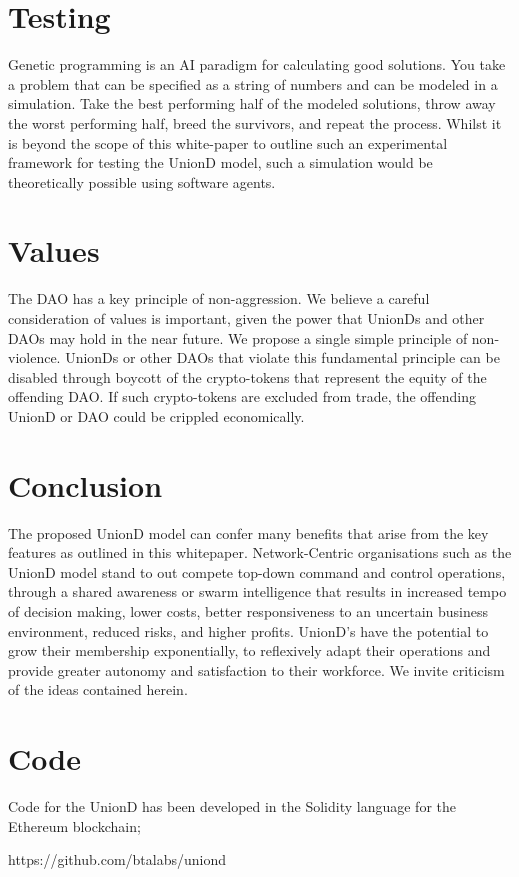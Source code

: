 \documentclass[12pt,twocolumn]{article}
\begin{document}
\section {Testing}

Genetic programming is an AI paradigm for calculating good solutions. You take a problem that can be specified as a string of numbers and can be modeled in a simulation. Take the best performing half of the modeled solutions, throw away the worst performing half, breed the survivors, and repeat the process. Whilst it is beyond the scope of this white-paper to outline such an experimental framework for testing the UnionD model, such a simulation would be theoretically possible using software agents. 

\section {Values}

The DAO has a key principle of non-aggression. We believe a careful consideration of values is important, given the power that UnionDs and other DAOs may hold in the near future. We propose a single simple principle of non-violence. UnionDs or other DAOs that violate this fundamental principle can be disabled through boycott of the crypto-tokens that represent the equity of the offending DAO. If such crypto-tokens are excluded from trade, the offending UnionD or DAO could be crippled economically.

\section {Conclusion}

The proposed UnionD model can confer many benefits that arise from the key features as outlined in this whitepaper. Network-Centric organisations such as the UnionD model stand to out compete top-down command and control operations, through a shared awareness or swarm intelligence that results in increased tempo of decision making, lower costs, better responsiveness to an uncertain business environment, reduced risks, and higher profits. UnionD's have the potential to grow their membership exponentially, to reflexively adapt their operations and provide greater autonomy and satisfaction to their workforce. We invite criticism of the ideas contained herein.

\section {Code}

Code for the UnionD has been developed in the Solidity language for the Ethereum blockchain;

https://github.com/btalabs/uniond
\end{document}
